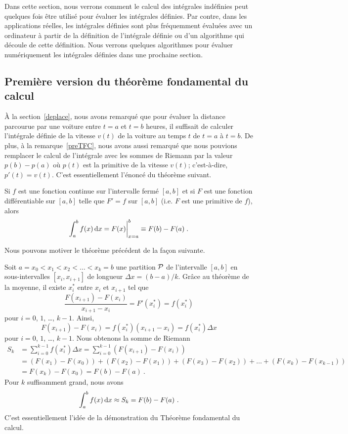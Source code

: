{Dans cette section, nous verrons comment le calcul des intégrales
indéfinies peut quelques fois être utilisé pour évaluer les intégrales
définies. Par contre, dans les applications réelles, les intégrales
définies sont plus fréquemment évaluées avec un ordinateur à partir de
la définition de l'intégrale définie ou d'un algorithme qui découle de
cette définition.  Nous verrons quelques algorithmes pour évaluer
numériquement les intégrales définies dans une prochaine section.

\subsection{Première version du théorème fondamental du calcul}

À la section~\ref{deplace}, nous avons remarqué que pour évaluer la
distance parcourue par une voiture entre $t=a$ et $t=b$ heures, il
suffisait de calculer l'intégrale définie de la vitesse $v(t)$ de la
voiture au temps $t$ de $t=a$ à $t=b$.  De plus, à la
remarque~\ref{preTFC}, nous avons aussi remarqué que nous pouvions
remplacer le calcul de l'intégrale avec les sommes de Riemann par la
valeur $p(b)-p(a)$ où $p(t)$ est la primitive de la vitesse $v(t)$;
c'est-à-dire, $p'(t) = v(t)$.  C'est essentiellement l'énoncé du
théorème suivant.

\begin{theorem}
Si $f$ est une fonction continue sur l'intervalle fermé $[a,b]$ et si
$F$ est une fonction différentiable sur $[a,b]$ telle que $F'=f$
sur $[a,b]$  (i.e. $F$ est une primitive de $f$), alors
\[
\int_a^b f(x)  \,\mathrm{d}x = F(x)\bigg|_{x=a}^{b} \equiv F(b) - F(a) \; .
\]
\end{theorem}

\begin{rmk}
Nous pouvons motiver le théorème précédent de la façon suivante.

Soit $a=x_0 < x_1 < x_2 < \ldots < x_k = b$ une partition ${\cal P}$
de l'intervalle $[a,b]$ en sous-intervalles $[x_i, x_{i+1}]$ de
longueur $\Delta x = (b-a)/k$.  Grâce au théorème de la moyenne, il existe
$x_i^\ast$ entre $x_i$ et $x_{i+1}$ tel que
\[
\frac{F(x_{i+1})-F(x_i)}{x_{i+1}-x_i} = F'(x_i^\ast) = f(x_i^\ast)
\]
pour $i=0$, $1$, \ldots, $k-1$.  Ainsi,
\[
F(x_{i+1})-F(x_i) = f(x_i^\ast) (x_{i+1}-x_i) = f(x_i^\ast) \Delta x
\]
pour $i=0$, $1$, \ldots, $k-1$.  Nous obtenons la somme de Riemann
\begin{align*}
S_k &= \sum_{i=0}^{k-1} f(x_i^\ast) \Delta x
= \sum_{i=0}^{k-1} \left( F(x_{i+1})-F(x_i) \right) \\
&= \left( F(x_1)-F(x_0) \right) + \left( F(x_2)-F(x_1) \right)
+ \left( F(x_3)-F(x_2) \right) + \ldots + \left( F(x_k)-F(x_{k-1}) \right) \\
&= F(x_k) - F(x_0) = F(b) - F(a) \ .
\end{align*}
Pour $k$ suffisamment grand, nous avons
\[
\int_a^b f(x) \,\mathrm{d}x \approx S_k = F(b) - F(a) \ .
\]
C'est essentiellement l'idée de la démonstration du Théorème
fondamental du calcul.
\end{rmk}

}
